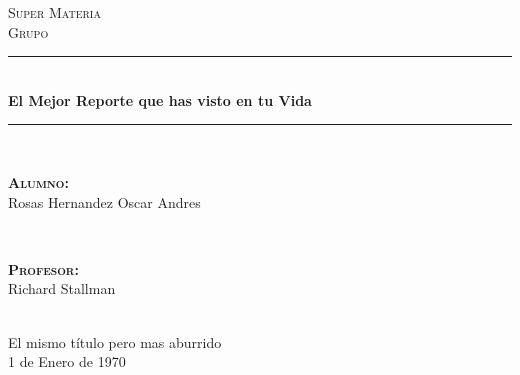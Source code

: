 \documentclass[12pt]{article}                               %
\author{Rosas Hernandez Oscar Andrés}                       %
\begin{document}
\begin{titlepage}

    \center
    \textsc{\Large Super Materia}\\[0.5cm] 
    \textsc{\large Grupo}\\[1.5cm]

    \rule{\linewidth}{0.5mm} \\[1.0cm]
        { \huge \bfseries El Mejor Reporte que has visto en tu Vida}\\[1.0cm] 
    \rule{\linewidth}{0.5mm} \\[2.0cm]
     
    \begin{minipage}{0.4\textwidth}
        \begin{flushleft} \large
            \textbf{\textsc{Alumno:}}\\
            Rosas Hernandez Oscar Andres
        \end{flushleft}
    \end{minipage}
    ~
    \begin{minipage}{0.4\textwidth}
        \begin{flushright} \large
            \textbf{\textsc{Profesor: }}\\
            Richard Stallman
        \end{flushright}
    \end{minipage}\\[3,5cm]

    {\LARGE El mismo título pero mas aburrido}\\[7cm] 
    
    
    {\large 1 de Enero de 1970}\\[2cm] 

    \vfill

\end{titlepage}






\end{document}
